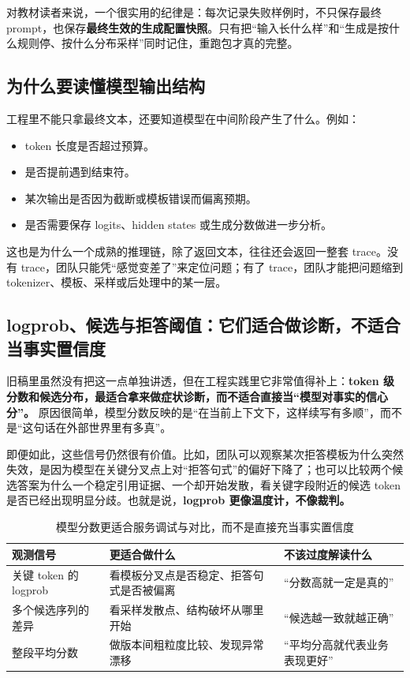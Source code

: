 对教材读者来说，一个很实用的纪律是：每次记录失败样例时，不只保存最终 prompt，也保存\textbf{最终生效的生成配置快照}。只有把“输入长什么样”和“生成是按什么规则停、按什么分布采样”同时记住，重跑包才真的完整。

\subsection{为什么要读懂模型输出结构}
工程里不能只拿最终文本，还要知道模型在中间阶段产生了什么。例如：
\begin{itemize}
  \item token 长度是否超过预算。
  \item 是否提前遇到结束符。
  \item 某次输出是否因为截断或模板错误而偏离预期。
  \item 是否需要保存 logits、hidden states 或生成分数做进一步分析。
\end{itemize}

这也是为什么一个成熟的推理链，除了返回文本，往往还会返回一整套 trace。没有 trace，团队只能凭“感觉变差了”来定位问题；有了 trace，团队才能把问题缩到 tokenizer、模板、采样或后处理中的某一层。

\subsection{logprob、候选与拒答阈值：它们适合做诊断，不适合当事实置信度}
旧稿里虽然没有把这一点单独讲透，但在工程实践里它非常值得补上：\textbf{token 级分数和候选分布，最适合拿来做症状诊断，而不适合直接当“模型对事实的信心分”。} 原因很简单，模型分数反映的是“在当前上下文下，这样续写有多顺”，而不是“这句话在外部世界里有多真”。

即便如此，这些信号仍然很有价值。比如，团队可以观察某次拒答模板为什么突然失效，是因为模型在关键分叉点上对“拒答句式”的偏好下降了；也可以比较两个候选答案为什么一个稳定引用证据、一个却开始发散，看关键字段附近的候选 token 是否已经出现明显分歧。也就是说，\textbf{logprob 更像温度计，不像裁判。}

\begin{table}[H]
\centering
\small
\begin{tabularx}{\textwidth}{>{\raggedright\arraybackslash}p{3cm}>{\raggedright\arraybackslash}p{3.2cm}>{\raggedright\arraybackslash}X}
\toprule
\textbf{观测信号} & \textbf{更适合做什么} & \textbf{不该过度解读什么} \\
\midrule
关键 token 的 logprob & 看模板分叉点是否稳定、拒答句式是否被偏离 & “分数高就一定是真的” \\
多个候选序列的差异 & 看采样发散点、结构破坏从哪里开始 & “候选越一致就越正确” \\
整段平均分数 & 做版本间粗粒度比较、发现异常漂移 & “平均分高就代表业务表现更好” \\
\bottomrule
\end{tabularx}
\caption{模型分数更适合服务调试与对比，而不是直接充当事实置信度}
\label{tab:logprob-usage}
\end{table}


